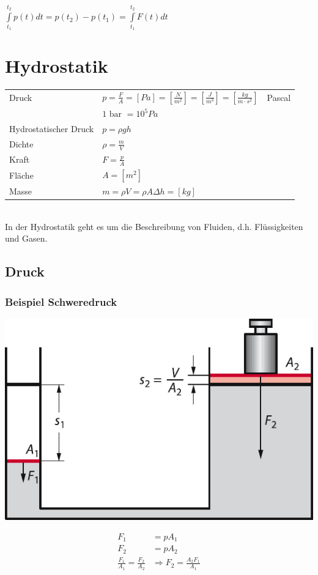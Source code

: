 \documentclass[a4paper]{scrartcl}
\begin{document}
	$\int\limits^{t_2}_{t_1} p(t) dt = p(t_2) - p(t_1) = \int\limits^{t_2}_{t_1} F(t) dt$


\section{Hydrostatik}
	\begin{tabu} {l X l}
		\hline
		Druck
		&	$p = \frac{F}{A} = \left[ Pa \right] = \left[ \frac{N}{m^2} \right] = \left[ \frac{J}{m^3} \right] = \left[ \frac{kg}{m \cdot s^2} \right]$
		&	Pascal \\
		& $1 \text{ bar } = 10^5 Pa$ &
		\\ \hline
		Hydrostatischer Druck
		& $p = \rho g h$ & \\ \hline
		Dichte
		& $\rho = \frac{m}{V}$ &\\ \hline
		Kraft
		& $F = \frac{p}{A}$ & \\ \hline
		Fläche
		& $A = \left[ m^2 \right]$ & \\ \hline
		Masse & $m = \rho V = \rho A \Delta h = \left[ kg \right]$
	\end{tabu}

	\hfill \\
	In der Hydrostatik geht es um die Beschreibung von Fluiden, d.h. Flüssigkeiten und Gasen.


\subsection{Druck}
\subsubsection{Beispiel Schweredruck}
	\begin{multicols}{2}
		\includegraphics[width=\linewidth]{img/hydrostatik}
		
		\begin{align*}
			F_1 &= p A_1\\
			F_2 &= p A_2\\
			\frac{F_1}{A_1} = \frac{F_2}{A_2} &\Rightarrow F_2 = \frac{A_2 F_1}{A_1}
		\end{align*}	
	\end{multicols}
\end{document}
